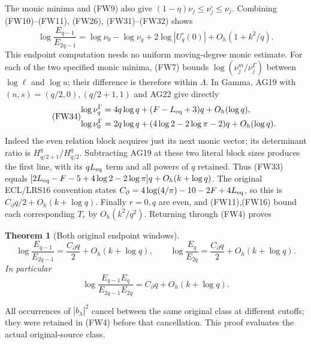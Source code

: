 \documentclass[11pt]{article}
\newtheorem{theorem}{Theorem}\newtheorem{lemma}[theorem]{Lemma}
\begin{document}
The monic minima and (FW9) also give
$(1-\eta)\nu_j\le\nu_j^\circ\le\nu_j$. Combining (FW10)--(FW11),
(FW26), (FW31)--(FW32) shows
\begin{equation}\tag{FW33}
 \log\frac{E_{q-1}}{E_{2q-1}}
 =\log\nu_0-\log\nu_q+2\log|U_q^\circ(0)|
                     +O_h(1+k^2/q).
\end{equation}
This endpoint computation needs no uniform moving-degree monic estimate.
For each of the two specified monic minima, (FW7) bounds
$\log(\nu_j^m/\nu_j^\Gamma)$ between $\log\ell$ and $\log u$;
their difference is therefore within $\Lambda$. In Gamma, AG19 with
$(n,s)=(q/2,0),(q/2+1,1)$ and AG22 give directly
\begin{equation}\tag{FW34}
 \begin{split}
 \log\nu_q^\Gamma&=4q\log q+(F-L_{\rm eq}+3)q+O_h(\log q),\\
 \log\nu_0^\Gamma&=2q\log q+(4\log2-2\log\pi-2)q+O_h(\log q).
 \end{split}
\end{equation}
Indeed the even relation block acquires just its next monic vector;
its determinant ratio is $H_{q/2+1}^q/H_{q/2}^q$. Subtracting AG19
at these two literal block sizes produces the first line, with its
$qL_{\rm eq}$ term and all powers of $q$ retained.
Thus (FW33) equals
$[2L_{\rm eq}-F-5+4\log2-2\log\pi]q+O_h(k+\log q)$.
The original ECL/LRS16 convention states
$C_\partial=4\log(4/\pi)-10-2F+4L_{\rm eq}$, so this is
$C_\partial q/2+O_h(k+\log q)$. Finally $r=0,q$ are even,
and (FW11),(FW16) bound each corresponding $T_r$ by $O_h(k^2/q^2)$.
Returning through (FW4) proves
\begin{theorem}[Both original endpoint windows]
\begin{equation}\tag{FW35}
 \log\frac{E_{q-1}}{E_{2q-1}}
 =\frac{C_\partial q}{2}+O_h(k+\log q),\qquad
 \log\frac{E_q}{E_{2q}}
 =\frac{C_\partial q}{2}+O_h(k+\log q).
\end{equation}
In particular
\begin{equation}\tag{FW36}
 \boxed{\log\frac{E_{q-1}E_q}{E_{2q-1}E_{2q}}
                    =C_\partial q+O_h(k+\log q).}
\end{equation}
\end{theorem}
All occurrences of $|b_\lambda|^2$ cancel between the same original
class at different cutoffs; they were retained in (FW4) before that
cancellation. This proof evaluates the actual original-source class.
\end{document}
